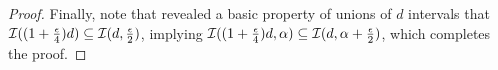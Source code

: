 \begin{proof}

Finally, note that \citet{BBBY12} revealed a basic property of unions of $d$ intervals that ${\mathcal{I}}((1+\frac\epsilon 4)d)\subseteq{\mathcal{I}}(d,\frac\epsilon 2)$, implying ${\mathcal{I}}((1+\frac\epsilon 4)d,\alpha)\subseteq {\mathcal{I}}(d,\alpha+\frac\epsilon 2)$, which completes the proof.



\end{proof}

